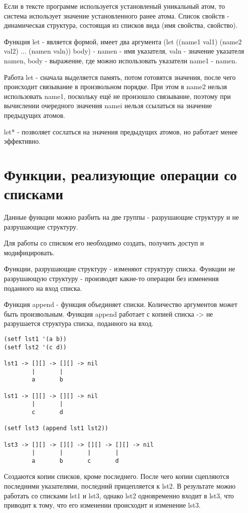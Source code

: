 Если в тексте программе используется установленый уникальный атом, то система использует значение установленного ранее атома. 
Список свойств - динамическая структура, состоящая из списков вида (имя свойства, свойство).

Функция let - является формой, имеет два аргумента (let ((name1 val1) (name2 val2) ... (namen valn)) body) - namen - имя указателя, valn - значение указателя namen, body - выражение, где можно использовать указатели name1 - namen. 

Работа let - сначала выделяется память, потом готовятся значения, после чего происходит связывание в произвольном порядке. При этом в name2 нельзя использовать name1, поскольку ещё не произошло связывание, поэтому при вычислении очередного значения namei нельзя ссылаться на значение предыдущих атомов.

let* - позволяет сослаться на значения предыдущих атомов, но работает менее эффективно.

\section{Функции, реализующие операции со списками}
Данные функции можно разбить на две группы - разрушающие структуру и не разрушающие структуру.

Для работы со списком его необходимо создать, получить доступ и модифицировать.

Функции, разрушающие структуру - изменяют структуру списка. Функции не разрушающую структуру - производят какие-то операции без изменения поданного на вход списка.

Функция append - функция объединяет списки. Количество аргументов может быть произвольным. Функция append работает с копией списка -> не разрушается структура списка, поданного на вход.

\begin{lstlisting}[label=some-code-2]
(setf lst1 '(a b))
(setf lst2 '(c d))

lst1 -> [][] -> [][] -> nil
        |       |
        a       b

lst1 -> [][] -> [][] -> nil
        |       |
        c       d

(setf lst3 (append lst1 lst2))

lst3 -> [][] -> [][] -> [][] -> [][] -> nil
        |       |       |       |
        a       b       c       d
\end{lstlisting}

Создаются копии списков, кроме последнего. После чего копии сцепляются последними указателями, последний прицепляется к lst2. В результате можно работать со списками lst1 и lst3, однако lst2 одновременно входит в lst3, что приводит к тому, что его изменении происходит и изменение lst3.

